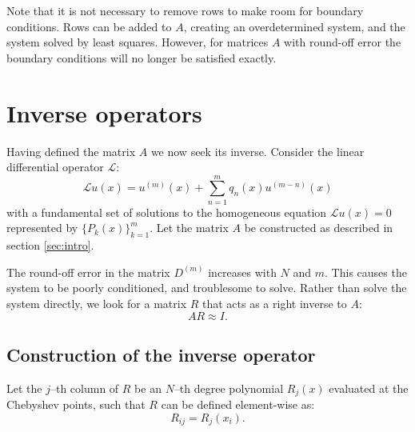 \documentclass{article}
\begin{document}
Note that it is not necessary to remove rows to make room for boundary conditions.
Rows can be added to $A$, creating an overdetermined system, and the system solved by least squares.
However, for matrices $A$ with round-off error the boundary conditions will no longer be satisfied exactly.

\newcommand{\W}[2]{W \left ( #1 ; #2 \right )}
\newcommand{\poly}[1]{\frac{x^{#1}}{(#1)!}}
\newcommand{\Poly}[1]{\frac{x^#1}{#1!}}

\section{Inverse operators}

Having defined the matrix $A$ we now seek its inverse.
Consider the linear differential operator $\mathcal{L}$:
\begin{equation}
\mathcal{L} u(x) = u^{(m)}(x) + \sum_{n = 1}^m q_n(x) u^{(m-n)}(x)
\end{equation}
with a fundamental set of solutions to the homogeneous equation $\mathcal{L} u(x) = 0$ represented by $\{ P_k(x) \}_{k=1}^m$.
Let the matrix $A$ be constructed as described in section \ref{sec:intro}.

The round-off error in the matrix $D^{(m)}$ increases with $N$ and $m$.
This causes the system to be poorly conditioned, and troublesome to solve.
Rather than solve the system directly, we look for a matrix $R$ that acts as a right inverse to $A$:
\begin{equation}
A R \approx I.
\end{equation}

\subsection{Construction of the inverse operator}

Let the $j$--th column of $R$ be an $N$--th degree polynomial $R_j(x)$ evaluated at the Chebyshev points, such that $R$ can be defined element-wise as:
\begin{equation}
R_{ij} = R_j(x_i) .
\end{equation}
\end{document}
